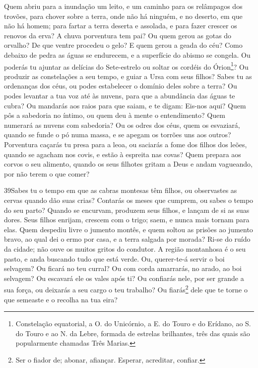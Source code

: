 Quem abriu para a inundação um leito, e um caminho para os
relâmpagos dos trovões, para chover sobre a terra, onde não
há ninguém, e no deserto, em que não há homem; para fartar a
terra deserta e assolada, e para fazer crescer os renovos da erva?
A chuva porventura tem pai? Ou quem gerou as gotas do
orvalho? De que ventre procedeu o gelo? E quem gerou a geada
do céu? Como debaixo de pedra as águas se endurecem, e a
superfície do abismo se congela. Ou poderás tu ajuntar as
delícias do Sete-estrelo ou soltar os cordéis do
Órion\footnote{Constelação equatorial, a O. do Unicórnio, a E. do
Touro e do Erídano, ao S. do Touro e ao N. da Lebre, formada de
estrelas brilhantes, três das quais são popularmente chamadas Três
Marias.}? Ou produzir as constelações a seu tempo, e guiar a
Ursa com seus filhos? Sabes tu as ordenanças dos céus, ou
podes estabelecer o domínio deles sobre a terra? Ou podes
levantar a tua voz até às nuvens, para que a abundância das águas te
cubra? Ou mandarás aos raios para que saiam, e te digam:
Eis-nos aqui? Quem pôs a sabedoria no íntimo, ou quem deu à
mente o entendimento? Quem numerará as nuvens com sabedoria?
Ou os odres dos céus, quem os esvaziará, quando se funde o pó
numa massa, e se apegam os torrões uns aos outros? Porventura
caçarás tu presa para a leoa, ou saciarás a fome dos filhos dos
leões, quando se agacham nos covis, e estão à espreita nas
covas? Quem prepara aos corvos o seu alimento, quando os seus
filhotes gritam a Deus e andam vagueando, por não terem o que comer?

\medskip

\lettrine{39} Sabes tu o tempo em que as cabras montesas têm
filhos, ou observastes as cervas quando dão suas crias? Contarás
os meses que cumprem, ou sabes o tempo do seu parto? Quando se
encurvam, produzem seus filhos, e lançam de si as suas dores.
Seus filhos enrijam, crescem com o trigo; saem, e nunca mais
tornam para elas. Quem despediu livre o jumento montês, e quem
soltou as prisões ao jumento bravo, ao qual dei o ermo por casa,
e a terra salgada por morada? Ri-se do ruído da cidade; não ouve
os muitos gritos do condutor. A região montanhosa é o seu pasto,
e anda buscando tudo que está verde. Ou, querer-te-á servir o
boi selvagem? Ou ficará no teu curral? Ou com corda
amarrarás, no arado, ao boi selvagem? Ou escavará ele os vales após
ti? Ou confiarás nele, por ser grande a sua força, ou
deixarás a seu cargo o teu trabalho? Ou fiarás\footnote{Ser o
fiador de; abonar, afiançar. Esperar, acreditar, confiar.} dele que
te torne o que semeaste e o recolha na tua eira?

